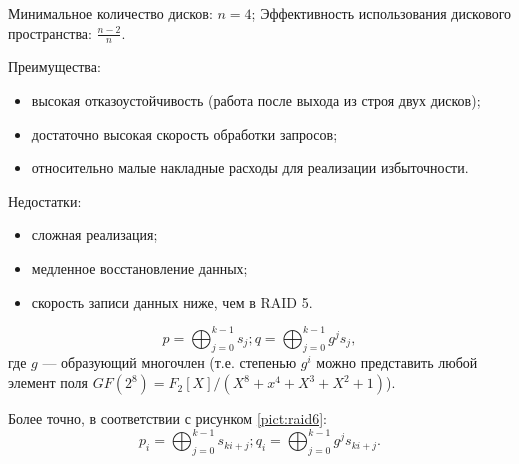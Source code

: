Минимальное количество дисков: $n=4$; Эффективность использования дискового пространства: $\frac{n-2}{n}$.

Преимущества:
\begin{itemize}
    \item высокая отказоустойчивость (работа после выхода из строя двух дисков);
    \item достаточно высокая скорость обработки запросов;
    \item относительно малые накладные расходы для реализации избыточности.
\end{itemize}

Недостатки:
\begin{itemize}
    \item сложная реализация;
    \item медленное восстановление данных;
    \item скорость записи данных ниже, чем в RAID 5.
\end{itemize}


\[
    p=\bigoplus_{j=0}^{k-1}s_{j}; q=\bigoplus_{j=0}^{k-1}g^js_{j},
\]
где $g$ --- образующий многочлен (т.е. степенью $g^i$ можно представить любой элемент поля $GF(2^8)=F_2[X]/(X^8+x^4+X^3+X^2+1)$).

Более точно, в соответствии с рисунком \ref{pict:raid6}:
\[
    p_i=\bigoplus_{j=0}^{k-1}s_{ki+j}; q_i=\bigoplus_{j=0}^{k-1}g^js_{ki+j}.
\]


